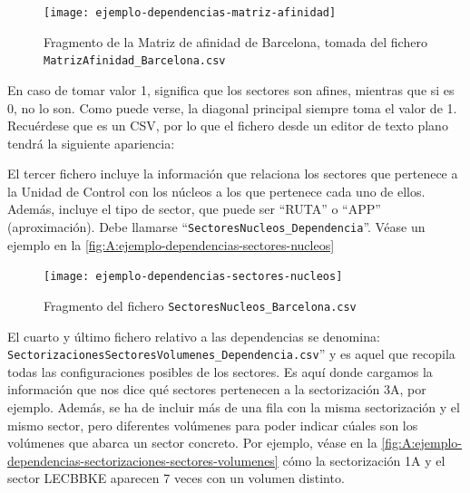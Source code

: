 \begin{figure}[h]
	\centering
	\texttt{[image: ejemplo-dependencias-matriz-afinidad]}
	\caption{Fragmento de la Matriz de afinidad de Barcelona, tomada del fichero \texttt{MatrizAfinidad\_Barcelona.csv}}
	\label{fig:A:ejemplo-dependencias-matriz-afinidad}
\end{figure}

En caso de tomar valor 1, significa que los sectores son afines, mientras que si es 0, no lo son. Como puede verse, la diagonal principal siempre toma el valor de 1. Recuérdese que es un CSV, por lo que el fichero desde un editor de texto plano tendrá la siguiente apariencia:

\noindent{}

El tercer fichero incluye la información que relaciona los sectores que pertenece a la Unidad de Control con los núcleos a los que pertenece cada uno de ellos. Además, incluye el tipo de sector, que puede ser ``RUTA'' o ``APP'' (aproximación). Debe llamarse ``\texttt{SectoresNucleos\_Dependencia}''. Véase un ejemplo en la \autoref{fig:A:ejemplo-dependencias-sectores-nucleos}

\begin{figure}[h]
	\centering
	\texttt{[image: ejemplo-dependencias-sectores-nucleos]}
	\caption{Fragmento del fichero \texttt{SectoresNucleos\_Barcelona.csv}}
	\label{fig:A:ejemplo-dependencias-sectores-nucleos}
\end{figure}

El cuarto y último fichero relativo a las dependencias se denomina:\\ \texttt{SectorizacionesSectoresVolumenes\_Dependencia.csv}'' y es aquel que recopila todas las configuraciones posibles de los sectores. Es aquí donde cargamos la información que nos dice qué sectores pertenecen a la sectorización 3A, por ejemplo. Además, se ha de incluir más de una fila con la misma sectorización y el mismo sector, pero diferentes volúmenes para poder indicar cúales son los volúmenes que abarca un sector concreto. Por ejemplo, véase en la \autoref{fig:A:ejemplo-dependencias-sectorizaciones-sectores-volumenes} cómo la sectorización 1A y el sector LECBBKE aparecen 7 veces con un volumen distinto.


